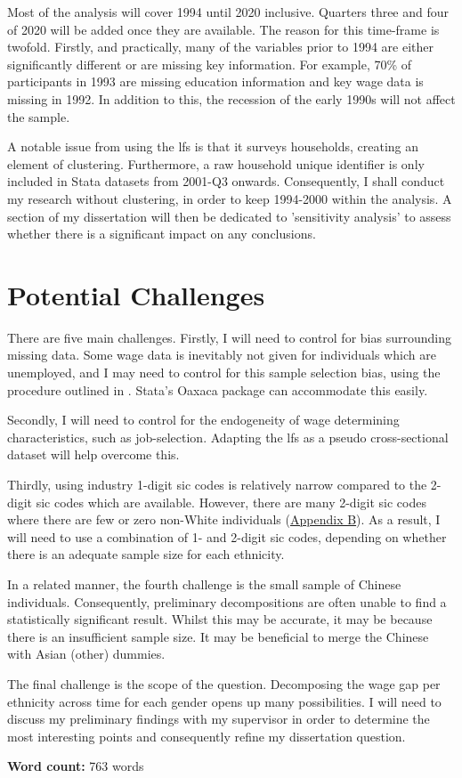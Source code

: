 \documentclass[class=article, crop=false]{standalone}
\begin{document}
Most of the analysis will cover 1994 until 2020 inclusive. Quarters three and four of 2020 will be added once they are available. The reason for this time-frame is twofold. Firstly, and practically, many of the variables prior to 1994 are either significantly different or are missing key information. For example, 70\% of participants in 1993 are missing education information and key wage data is missing in 1992. In addition to this, the recession of the early 1990s will not affect the sample. 

A notable issue from using the \acrlong{lfs} is that it surveys households, creating an element of clustering. Furthermore, a raw household unique identifier is only included in Stata datasets from 2001-Q3 onwards. Consequently, I shall conduct my research without clustering, in order to keep 1994-2000 within the analysis. A section of my dissertation will then be dedicated to 'sensitivity analysis' to assess whether there is a significant impact on any conclusions.

\section{Potential Challenges}
There are five main challenges. Firstly, I will need to control for bias surrounding missing data. Some wage data is inevitably not given for individuals which are unemployed, and I may need to control for this sample selection bias, using the procedure outlined in \cite{Heckmana, Heckmanb}. Stata's Oaxaca package can accommodate this easily.

Secondly, I will need to control for the endogeneity of wage determining characteristics, such as job-selection. Adapting the \acrshort{lfs} as a pseudo cross-sectional dataset will help overcome this.

Thirdly, using industry 1-digit \acrshort{sic} codes is relatively narrow compared to the 2-digit \acrshort{sic} codes which are available. However, there are many 2-digit \acrshort{sic} codes where there are few or zero non-White individuals (\hyperref[sec:appendix B]{Appendix B}). As a result, I will need to use a combination of 1- and 2-digit \acrshort{sic} codes, depending on whether there is an adequate sample size for each ethnicity.

In a related manner, the fourth challenge is the small sample of Chinese individuals. Consequently, preliminary decompositions are often unable to find a statistically significant result. Whilst this may be accurate, it may be because there is an insufficient sample size. It may be beneficial to merge the Chinese with Asian (other) dummies.

The final challenge is the scope of the question. Decomposing the wage gap per ethnicity across time for each gender opens up many possibilities. I will need to discuss my preliminary findings with my supervisor in order to determine the most interesting points and consequently refine my dissertation question.

\textbf{Word count:} 763 words
\ifstandalone

\fi
\end{document}
